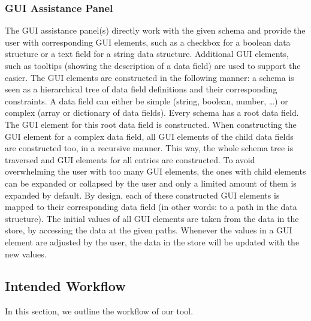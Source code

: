 
\subsubsection{GUI Assistance Panel}
The GUI assistance panel(s) directly work with the given schema and provide the user with corresponding GUI elements, such as a checkbox for a boolean data structure or a text field for a string data structure.
Additional GUI elements, such as tooltips (showing the description of a data field) are used to support the easier.
The GUI elements are constructed in the following manner: a schema is seen as a hierarchical tree of data field definitions and their corresponding constraints.
A data field can either be simple (string, boolean, number, \ldots) or complex (array or dictionary of data fields).
Every schema has a root data field.
The GUI element for this root data field is constructed. %
When constructing the GUI element for a complex data field, all GUI elements of the child data fields are constructed too, in a recursive manner.
This way, the whole schema tree is traversed and GUI elements for all entries are constructed.
To avoid overwhelming the user with too many GUI elements, the ones with child elements can be expanded or collapsed by the user and only a limited amount of them is expanded by default.
By design, each of these constructed GUI elements is mapped to their corresponding data field (in other words: to a path in the data structure).
The initial values of all GUI elements are taken from the data in the store, by accessing the data at the given paths.
Whenever the values in a GUI element are adjusted by the user, the data in the store will be updated with the new values.


%

\subsection{Intended Workflow}\label{subsec:workflow} %
In this section, we outline the workflow of our tool.

